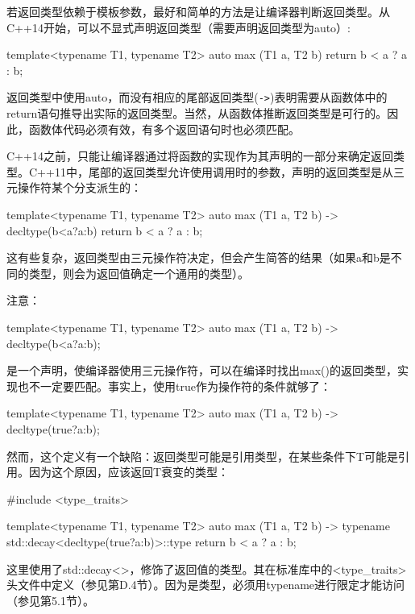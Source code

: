 若返回类型依赖于模板参数，最好和简单的方法是让编译器判断返回类型。从C++14开始，可以不显式声明返回类型（需要声明返回类型为auto）:

\begin{cpp}
template<typename T1, typename T2>
auto max (T1 a, T2 b)
{
	return b < a ? a : b;
}
\end{cpp}

返回类型中使用auto，而没有相应的尾部返回类型(\texttt{->})表明需要从函数体中的return语句推导出实际的返回类型。当然，从函数体推断返回类型是可行的。因此，函数体代码必须有效，有多个返回语句时也必须匹配。

C++14之前，只能让编译器通过将函数的实现作为其声明的一部分来确定返回类型。C++11中，尾部的返回类型允许使用调用时的参数，声明的返回类型是从三元操作符某个分支派生的：

\begin{cpp}
template<typename T1, typename T2>
auto max (T1 a, T2 b) -> decltype(b<a?a:b)
{
	return b < a ? a : b;
}
\end{cpp}

这有些复杂，返回类型由三元操作符决定，但会产生简答的结果（如果a和b是不同的类型，则会为返回值确定一个通用的类型）。

注意：

\begin{cpp}
template<typename T1, typename T2>
auto max (T1 a, T2 b) -> decltype(b<a?a:b);
\end{cpp}

是一个声明，使编译器使用三元操作符，可以在编译时找出max()的返回类型，实现也不一定要匹配。事实上，使用true作为操作符的条件就够了：

\begin{cpp}
template<typename T1, typename T2>
auto max (T1 a, T2 b) -> decltype(true?a:b);
\end{cpp}

然而，这个定义有一个缺陷：返回类型可能是引用类型，在某些条件下T可能是引用。因为这个原因，应该返回T衰变的类型：

\begin{cpp}
#include <type_traits>

template<typename T1, typename T2>
auto max (T1 a, T2 b) -> typename std::decay<decltype(true?a:b)>::type
{
	return b < a ? a : b;
}
\end{cpp}

这里使用了std::decay<>，修饰了返回值的类型。其在标准库中的<type\_traits>头文件中定义（参见第D.4节）。因为是类型，必须用typename进行限定才能访问（参见第5.1节）。

